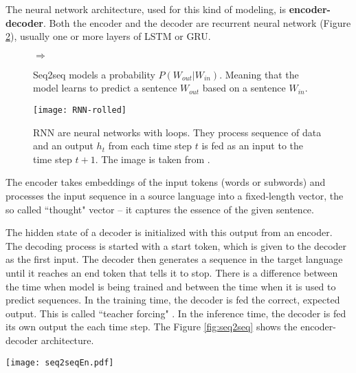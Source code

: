 \documentclass{ExcelAtFIT}
\begin{document}
The neural network architecture, used for this kind of modeling, is \textbf{encoder-decoder}. Both the encoder and the decoder are recurrent neural network (Figure \ref{fig:rnn}), usually one or more layers of LSTM or GRU.

\begin{figure}[h!]
    \begin{center}
        \setlength{\fboxsep}{8pt}
        $\Longrightarrow$
    \end{center}
	\caption{Seq2seq models a probability $P(W_{out}|W_{in})$. Meaning that the model learns to predict a sentence $W_{out}$ based on a sentence $W_{in}$.}
	\label{fig:seqProbability}
\end{figure}

\begin{figure}[h!]\centering
  \centering
  \texttt{[image: RNN-rolled]}
  \caption{RNN are neural networks with loops. They process sequence of data and an output $h_t$ from each time step $t$ is fed as an input to the time step $t+1$. The image is taken from \cite{understandingLSTM}.}
  \label{fig:rnn}
\end{figure}


The encoder takes embeddings of the input tokens (words or subwords) and processes the input sequence in a source language into a fixed-length vector, the so called ``thought" vector -- it captures the essence of the given sentence.

The hidden state of a decoder is initialized with this output from an encoder. The decoding process is started with a start token, which is given to the decoder as the first input. The decoder then generates a sequence in the target language until it reaches an end token that tells it to stop. There is a difference between the time when model is being trained and between the time when it is used to predict sequences. In the training time, the decoder is fed the correct, expected output. This is called ``teacher forcing" \cite{teacherForcing}. In the inference time, the decoder is fed its own output the each time step. The Figure \ref{fig:seq2seq} shows the encoder-decoder architecture.

\begin{figure*}[h!]\centering %
  \centering
  \texttt{[image: seq2seqEn.pdf]}\\[1pt]
  \caption{The encoder-decoder architecture shown on translation from a Czech sentence to its English equivalent. The encoder processes embeddings of the input sequence and produces the fixed-length ``thought" vector. This vector is used as initial state of the decoder, it tells it from what context should it produce the output in the target language. The prediction is started with the $\langle s \rangle$ starting token. Then the decoder is fed either correct output tokens during the training time or its own output, from the time $t - 1$, during inference time, until it generates the ending $\langle /s \rangle$ token.}
  \label{fig:seq2seq}
\end{figure*}
\end{document}

